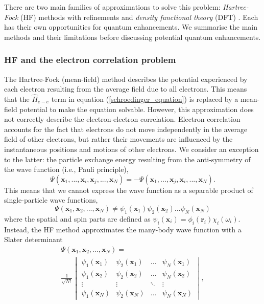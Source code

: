 \documentclass[10pt]{iopart}
\begin{document}
There are two main families of approximations to solve this problem: \textit{Hartree-Fock} (HF) \cite{slater1951} methods with refinements and \textit{density functional theory} (DFT) \cite{Hohenberg1964,Kohn1965}.  Each has their own opportunities for quantum enhancements.  We summarise the main methods and their limitations before discussing potential quantum enhancements.

\subsubsection{HF and the electron correlation problem}\hfill

The Hartree-Fock (mean-field) method \cite{Echenique2007} describes the potential experienced by each electron resulting from the average field due to all electrons. This means that the $\hat{H}_{e-e}$ term in equation (\ref{schroedinger_equation}) is replaced by a mean-field potential to make the equation solvable. However, this approximation does not correctly describe the 
electron-electron correlation.  Electron correlation accounts for the fact that electrons do not move independently in the average field of other electrons, but rather their movements are influenced by the instantaneous positions and motions of other electrons. We consider an exception to the latter: the particle exchange energy resulting from the anti-symmetry of the wave function (i.e., Pauli principle),
\begin{equation}
\Psi(\mathbf{x}_1, ..., \mathbf{x}_i, \mathbf{x}_j, ..., \mathbf{x}_N) = 
-\Psi(\mathbf{x}_1, ..., \mathbf{x}_j, \mathbf{x}_i, ..., \mathbf{x}_N).
\end{equation}
This means that we cannot express the wave function as a separable product of single-particle wave functions,
\begin{equation}
\Psi(\mathbf{x}_1, \mathbf{x}_2, ..., \mathbf{x}_N) \neq \psi_1(\mathbf{x}_1) \psi_2(\mathbf{x}_2) ... \psi_N(\mathbf{x}_N)
\end{equation}
where the spatial and spin parts are defined as $\psi_i(\mathbf{x}_i) = \phi_i(\mathbf{r}_i) \chi_i(\omega_i)$. Instead, the HF method approximates the many-body wave function with a Slater determinant
\begin{multline}
\Psi(\mathbf{x}_1, \mathbf{x}_2, ..., \mathbf{x}_N) =\\ 
\frac{1}{\sqrt{N!}}
\begin{vmatrix}
\psi_1(\mathbf{x}_1) & \psi_2(\mathbf{x}_1) & ... & \psi_N(\mathbf{x}_1) \\
\psi_1(\mathbf{x}_2) & \psi_2(\mathbf{x}_2) & ... & \psi_N(\mathbf{x}_2) \\
\vdots & \vdots & \ddots & \vdots \\
\psi_1(\mathbf{x}_N) & \psi_2(\mathbf{x}_N) & ... & \psi_N(\mathbf{x}_N)
\end{vmatrix},
\label{slater_determinant}
\end{multline}
\end{document}
